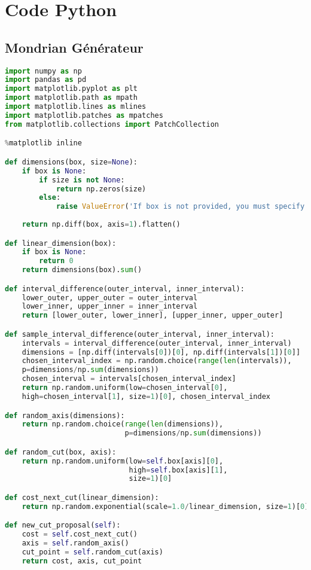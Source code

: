 \section*{Code Python}
\subsection*{Mondrian Générateur}
\begin{lstlisting}[language=Python]
import numpy as np
import pandas as pd
import matplotlib.pyplot as plt
import matplotlib.path as mpath
import matplotlib.lines as mlines
import matplotlib.patches as mpatches
from matplotlib.collections import PatchCollection

%matplotlib inline

def dimensions(box, size=None):
    if box is None:
        if size is not None:
            return np.zeros(size)
        else: 
            raise ValueError('If box is not provided, you must specify size.')
            
    return np.diff(box, axis=1).flatten()

def linear_dimension(box):
    if box is None:
        return 0
    return dimensions(box).sum()

def interval_difference(outer_interval, inner_interval):
    lower_outer, upper_outer = outer_interval
    lower_inner, upper_inner = inner_interval
    return [lower_outer, lower_inner], [upper_inner, upper_outer]

def sample_interval_difference(outer_interval, inner_interval):
    intervals = interval_difference(outer_interval, inner_interval)
    dimensions = [np.diff(intervals[0])[0], np.diff(intervals[1])[0]]
    chosen_interval_index = np.random.choice(range(len(intervals)),
    p=dimensions/np.sum(dimensions))
    chosen_interval = intervals[chosen_interval_index]
    return np.random.uniform(low=chosen_interval[0], 
    high=chosen_interval[1], size=1)[0], chosen_interval_index

def random_axis(dimensions):
    return np.random.choice(range(len(dimensions)), 
                            p=dimensions/np.sum(dimensions))

def random_cut(box, axis):
    return np.random.uniform(low=self.box[axis][0], 
                             high=self.box[axis][1], 
                             size=1)[0]

def cost_next_cut(linear_dimension):
    return np.random.exponential(scale=1.0/linear_dimension, size=1)[0]

def new_cut_proposal(self):
    cost = self.cost_next_cut()
    axis = self.random_axis()
    cut_point = self.random_cut(axis)
    return cost, axis, cut_point


\end{lstlisting}
